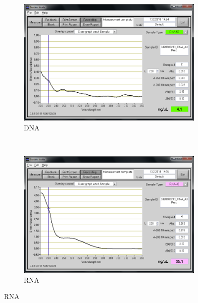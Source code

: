 \begin{figure}[H] %
    \centering
    \caption{Screen captures of the NanoDrop\cR analysis}
    \label{fig:CJ20180213_DNA_RNA_AllPrep}
    \begin{subfigure}[b]{0.49\textwidth}
        \includegraphics[width=\textwidth]{graphics/screenshots/CJ20180213_DNA_AllPrep.png}
        \caption{DNA}
        \label{sfig:CJ20180213_DNA_AllPrep}
    \end{subfigure}
    ~ 
    \begin{subfigure}[b]{0.49\textwidth}
        \includegraphics[width=\textwidth]{graphics/screenshots/CJ20180213_RNA_AllPrep.png}
        \caption{RNA}
        \label{sfig:CJ20180213_RNA_AllPrep}
    \end{subfigure}
\end{figure}

